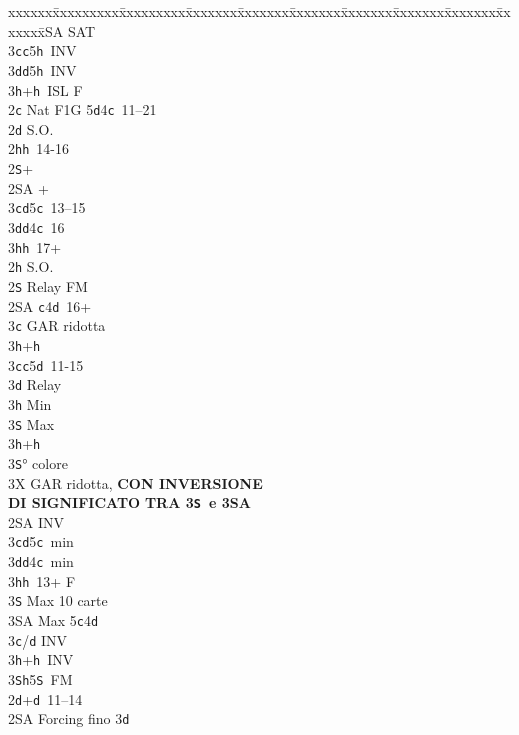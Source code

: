 \documentclass[a4paper,italian]{article}
\newcommand{\BS}{\small{\texttt{S}}}
\newcommand{\BC}{\small{\texttt{c}}}
\newcommand{\BD}{\small{\texttt{d}}}
\newcommand{\BH}{\small{\texttt{h}}}
\newenvironment{bidtable}
{\begin{tabbing}

    xxxxxx\=xxxxxxxxx\=xxxxxxxxx\=xxxxxxx\=xxxxxxx\=xxxxxxx\=xxxxxxx\=xxxxxxx\=xxxxxxx\=xxxxxxx\=\kill}
{\end{tabbing} }%
\begin{document}
\begin{multicols}{2}
\begin{bidtable}
        2\small{SA} \small{SA}T\\
        3\BC {}\BC 5\BH\ INV\\
        3\BD {}\BD 5\BH\ INV\\
        3\BH {}+\BH\ ISL F\-\\
        2\BC \> Nat F1G 5\BD 4\BC\ 11--21\+\\
        2\BD \> S.O.\+\\
        2\BH {}\BH\ 14-16\\
        2\BS {}+\\
        2\small{SA} +\\
        3\BC {}\BD 5\BC\ 13--15\\
        3\BD {}\BD 4\BC\ 16\\
        3\BH {}\BH\ 17+\-\\
        2\BH \> S.O.\\
        2\BS \> Relay FM\+\\
        2\small{SA} \BC 4\BD\ 16+\+\\
        3\BC \> GAR ridotta\\
        3\BH {}+\BH \-\\
        3\BC {}\BC 5\BD\ 11-15\+\\
        3\BD \> Relay\+\\
        3\BH \> Min\\
        3\BS \> Max\-\\
        3\BH {}+\BH \\
        3\BS {}° colore\-\\
        3X \> GAR ridotta, \textbf{CON INVERSIONE}\+\\
        \textbf{DI SIGNIFICATO}
        \textbf{TRA 3\BS\ e 3\small{SA}}\-\-\\
        2\small{SA} \> INV\+\\
        3\BC {}\BD 5\BC\ min\\
        3\BD {}\BD 4\BC\ min\\
        3\BH {}\BH\ 13+ F\\
        3\BS \> Max 10 carte\\
        3\small{SA} \> Max 5\BC 4\BD \-\\
        3\BC/\BD \> INV\\
        3\BH {}+\BH\ INV\\
        3\BS {}\BH 5\BS\ FM\-\\
        2\BD {}+\BD\ 11--14\+\\
        2\small{SA} \> Forcing fino 3\BD \+\\

\end{bidtable}
\end{multicols}
\end{document}
